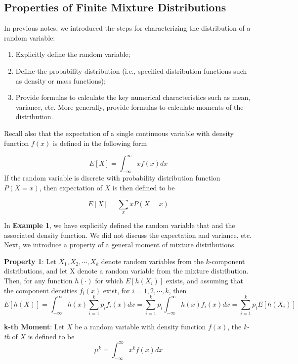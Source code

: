 \documentclass[
]{book}
\begin{document}
\hypertarget{properties-of-finite-mixture-distributions}{%
\subsection{Properties of Finite Mixture Distributions}\label{properties-of-finite-mixture-distributions}}

In previous notes, we introduced the steps for characterizing the distribution of a random variable:

\begin{enumerate}
\def\labelenumi{\arabic{enumi}.}
\item
  Explicitly define the random variable;
\item
  Define the probability distribution (i.e., specified distribution functions such as density or mass functions);
\item
  Provide formulas to calculate the key numerical characteristics such as mean, variance, etc. More generally, provide formulas to calculate moments of the distribution.
\end{enumerate}

\hfill\break

Recall also that the expectation of a single continuous variable with density function \(f(x)\) is defined in the following form

\[
E[X] = \int_{-\infty}^\infty xf(x)dx
\]
If the random variable is discrete with probability distribution function \(P(X = x)\), then expectation of \(X\) is then defined to be

\[
E[X] = \sum_{x}xP(X = x)
\]

In \textbf{Example 1}, we have explicitly defined the random variable that and the associated density function. We did not discuss the expectation and variance, etc. Next, we introduce a property of a general moment of mixture distributions.

\textbf{Property 1}: Let \(X_1, X_2, \cdots, X_k\) denote random variables from the \(k\)-component distributions, and let X denote a random variable from the mixture distribution. Then, for any function \(h(\cdot)\) for which \(E[h(X_i)]\) exists, and assuming that the component densities \(f_i(x)\) exist, for \(i = 1, 2, \cdots, k\), then
\[
E[h(X)] = \int_{-\infty}^\infty h(x)\sum_{i=1}^k p_i f_i(x) dx = \sum_{i=1}^k p_i\int_{-\infty}^\infty h(x)f_i(x) dx = \sum_{i=1}^k p_i E[h(X_i)]
\]

\textbf{k-th Moment}: Let \(X\) be a random variable with density function \(f(x)\), the \emph{k-th} of \(X\) is defined to be
\[
\mu^k = \int_{-\infty}^\infty x^k f(x) dx
\]
\end{document}
